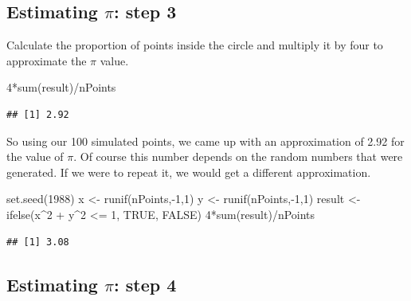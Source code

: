 \documentclass[
]{book}
\newenvironment{Shaded}{\begin{snugshade}}{\end{snugshade}}
\newcommand{\ConstantTok}[1]{\textcolor[rgb]{0.00,0.00,0.00}{#1}}
\newcommand{\DecValTok}[1]{\textcolor[rgb]{0.00,0.00,0.81}{#1}}
\newcommand{\FunctionTok}[1]{\textcolor[rgb]{0.00,0.00,0.00}{#1}}
\newcommand{\NormalTok}[1]{#1}
\newcommand{\OtherTok}[1]{\textcolor[rgb]{0.56,0.35,0.01}{#1}}
\newcommand{\SpecialCharTok}[1]{\textcolor[rgb]{0.00,0.00,0.00}{#1}}
\begin{document}
\hypertarget{estimating-pi-step-3}{%
\subsection{\texorpdfstring{Estimating \(\pi\): step 3}{Estimating \textbackslash pi: step 3}}\label{estimating-pi-step-3}}

Calculate the proportion of points inside the circle and multiply it by four to approximate the \(\pi\) value.

\begin{Shaded}
\begin{Highlighting}[]
\DecValTok{4}\SpecialCharTok{*}\FunctionTok{sum}\NormalTok{(result)}\SpecialCharTok{/}\NormalTok{nPoints}
\end{Highlighting}
\end{Shaded}

\begin{verbatim}
## [1] 2.92
\end{verbatim}

So using our 100 simulated points, we came up with an approximation of 2.92 for the value of \(\pi\). Of course this number depends on the random numbers that were generated. If we were to repeat it, we would get a different approximation.

\begin{Shaded}
\begin{Highlighting}[]
\FunctionTok{set.seed}\NormalTok{(}\DecValTok{1988}\NormalTok{)}
\NormalTok{x }\OtherTok{\textless{}{-}} \FunctionTok{runif}\NormalTok{(nPoints,}\SpecialCharTok{{-}}\DecValTok{1}\NormalTok{,}\DecValTok{1}\NormalTok{)}
\NormalTok{y }\OtherTok{\textless{}{-}} \FunctionTok{runif}\NormalTok{(nPoints,}\SpecialCharTok{{-}}\DecValTok{1}\NormalTok{,}\DecValTok{1}\NormalTok{)}
\NormalTok{result }\OtherTok{\textless{}{-}} \FunctionTok{ifelse}\NormalTok{(x}\SpecialCharTok{\^{}}\DecValTok{2} \SpecialCharTok{+}\NormalTok{ y}\SpecialCharTok{\^{}}\DecValTok{2} \SpecialCharTok{\textless{}=} \DecValTok{1}\NormalTok{, }\ConstantTok{TRUE}\NormalTok{, }\ConstantTok{FALSE}\NormalTok{)}
\DecValTok{4}\SpecialCharTok{*}\FunctionTok{sum}\NormalTok{(result)}\SpecialCharTok{/}\NormalTok{nPoints}
\end{Highlighting}
\end{Shaded}

\begin{verbatim}
## [1] 3.08
\end{verbatim}

\hypertarget{estimating-pi-step-4}{%
\subsection{\texorpdfstring{Estimating \(\pi\): step 4}{Estimating \textbackslash pi: step 4}}\label{estimating-pi-step-4}}
\end{document}
